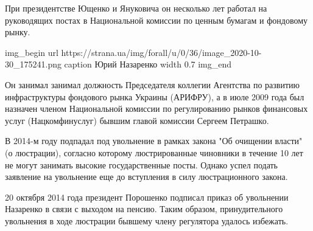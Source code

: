При президентстве Ющенко и Януковича он несколько лет работал на руководящих
постах в Национальной комиссии по ценным бумагам и фондовому рынку.
  
\ifcmt
img_begin 
	url https://strana.ua/img/forall/u/0/36/image_2020-10-30_175241.png
	caption Юрий Назаренко
	width 0.7
img_end
\fi  

Он занимал занимал должность Председателя коллегии Агентства по развитию
инфраструктуры фондового рынка Украины (АРИФРУ), а в июле 2009 года был
назначен членом Национальной комиссии по регулированию рынков финансовых услуг
(Нацкомфинуслуг) бывшим главой комиссии Сергеем Петрашко.

В 2014-м году подпадал под увольнение в рамках закона "Об очищении власти" (о
люстрации), согласно которому люстрированные чиновники в течение 10 лет не
могут занимать высокие государственные посты. Однако успел подать заявление на
увольнение еще до вступления в силу люстрационного закона.

20 октября 2014 года президент Порошенко подписал приказ об увольнении
Назаренко в связи с выходом на пенсию. Таким образом, принудительного
увольнения в ходе люстрации бывшему члену регулятора удалось избежать.
